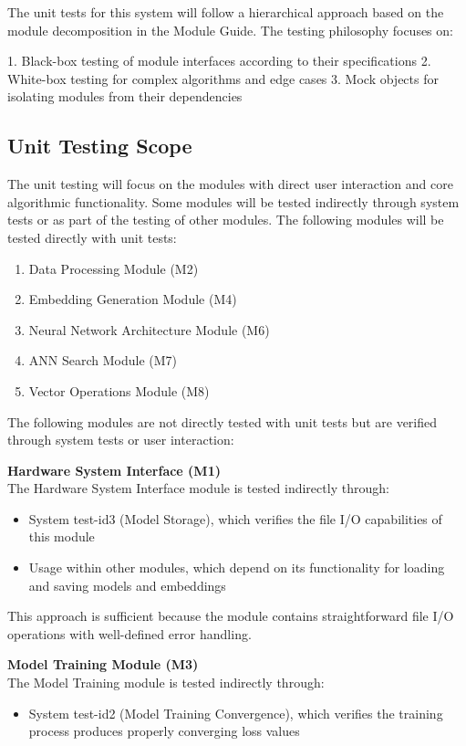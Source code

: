 \documentclass[12pt, titlepage]{article}
\begin{document}
The unit tests for this system will follow a hierarchical approach based on the module decomposition in the Module Guide. The testing philosophy focuses on:

1. Black-box testing of module interfaces according to their specifications
2. White-box testing for complex algorithms and edge cases
3. Mock objects for isolating modules from their dependencies

\subsection{Unit Testing Scope}

The unit testing will focus on the modules with direct user interaction and core algorithmic functionality. Some modules will be tested indirectly through system tests or as part of the testing of other modules. The following modules will be tested directly with unit tests:
\begin{enumerate}
  \item Data Processing Module (M2)
  \item Embedding Generation Module (M4)
  \item Neural Network Architecture Module (M6)
  \item ANN Search Module (M7)
  \item Vector Operations Module (M8)
\end{enumerate}


The following modules are not directly tested with unit tests but are verified through system tests or user interaction:

\noindent\textbf{Hardware System Interface (M1)}\\
The Hardware System Interface module is tested indirectly through:
\begin{itemize}
    \item System test-id3 (Model Storage), which verifies the file I/O capabilities of this module
    \item Usage within other modules, which depend on its functionality for loading and saving models and embeddings
\end{itemize}

This approach is sufficient because the module contains straightforward file I/O operations with well-defined error handling.

\noindent\textbf{Model Training Module (M3)}\\
The Model Training module is tested indirectly through:
\begin{itemize}
    \item System test-id2 (Model Training Convergence), which verifies the training process produces properly converging loss values
\end{itemize}
\end{document}
